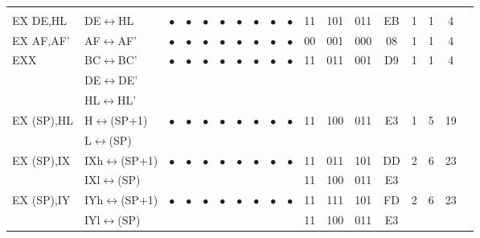 \documentclass[oneside,a4paper]{book}
\newcommand{\instrt}{\rule{0pt}{2.7ex}}
\newcommand{\instrb}{\rule[-1.7ex]{0pt}{0pt}}
\begin{document}
{\tt \scriptsize \setlength{\fboxsep}{0.25mm}
	\setlength{\tabcolsep}{1mm}
	\begin{tabular}{llcccccccccccccccl}
		     
		\instrheader

		& & & & & & & & & & & & & & & & & \\

		EX DE,HL\instrt & 
			DE$\leftrightarrow$HL & 
			$\bullet$ & 
				$\bullet$ & 
				$\bullet$ & 
				$\bullet$ & 
				$\bullet$ & 
				$\bullet$ & 
				$\bullet$ & 
				$\bullet$ & 
			11 & 101 & 011 & 
			EB & 1 & 
			1 & 4 & \instrb \\

		EX AF,AF'\instrt & 
			AF$\leftrightarrow$AF' & 
			$\bullet$ & 
				$\bullet$ & 
				$\bullet$ & 
				$\bullet$ & 
				$\bullet$ & 
				$\bullet$ & 
				$\bullet$ & 
				$\bullet$ & 	
			00 & 001 & 000
			& 08 & 1 & 1 & 4 & \instrb \\

		EXX\instrt & 
			BC$\leftrightarrow$BC' & 
			$\bullet$ & 
				$\bullet$ & 
				$\bullet$ & 
				$\bullet$ & 
				$\bullet$ & 
				$\bullet$ & 
				$\bullet$ & 
				$\bullet$ & 
			11 & 011 & 001 & 
			D9 & 1 & 1 & 4 & \\ 
		& DE$\leftrightarrow$DE' & \\ 
		& HL$\leftrightarrow$HL' & \instrb \\

		EX (SP),HL\instrt & 
			H$\leftrightarrow$(SP+1) & 
			$\bullet$ & 
				$\bullet$ & 
				$\bullet$ & 
				$\bullet$ & 
				$\bullet$ & 
				$\bullet$ & 
				$\bullet$ & 
				$\bullet$ & 
			11 & 100 & 011 & 
			E3 & 1 & 
			5 & 19 & \\ 
		& L$\leftrightarrow$(SP) & \instrb \\

		EX (SP),IX\instrt & 
			IXh$\leftrightarrow$(SP+1) & 
			$\bullet$ & 
				$\bullet$ & 
				$\bullet$ & 
				$\bullet$ & 
				$\bullet$ & 
				$\bullet$ & 
				$\bullet$ & 
				$\bullet$ & 
			11 & 011 & 101 & 
			DD & 2 & 
			6 & 23 & \\ 
		& IXl$\leftrightarrow$(SP) & \multicolumn{8}{c}{} & 11 & 100 & 011 & E3 & & \instrb \\

		EX (SP),IY\instrt & 
			IYh$\leftrightarrow$(SP+1) & 
			$\bullet$ & 
				$\bullet$ & 
				$\bullet$ & 
				$\bullet$ & 
				$\bullet$ & 
				$\bullet$ & 
				$\bullet$ & 
				$\bullet$ & 
			11 & 111 & 101 & 
			FD & 2 & 
			6 & 23 & \\
		& IYl$\leftrightarrow$(SP) & \multicolumn{8}{c}{} & 11 & 100 & 011 & E3 & & \instrb \\


\end{tabular}}
\end{document}
